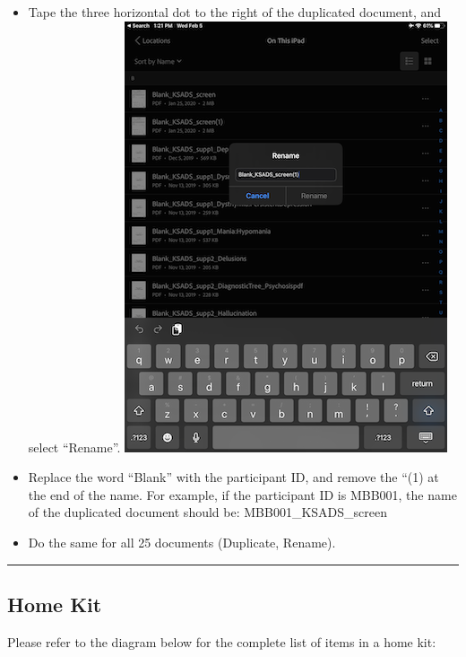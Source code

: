 \documentclass[]{book}
\begin{document}
\begin{itemize}
\begin{itemize}
  \item
    Tape the three horizontal dot to the right of the duplicated document, and select ``Rename''.
    \includegraphics{images/ksads/6.png}
  \item
    Replace the word ``Blank'' with the participant ID, and remove the ``(1) at the end of the name. For example, if the participant ID is MBB001, the name of the duplicated document should be: MBB001\_KSADS\_screen
  \item
    Do the same for all 25 documents (Duplicate, Rename).
  \end{itemize}
\end{itemize}

\begin{center}\rule{0.5\linewidth}{0.5pt}\end{center}

\hypertarget{home-kit}{%
\subsection{Home Kit}\label{home-kit}}

Please refer to the diagram below for the complete list of items in a home kit:
\end{document}
